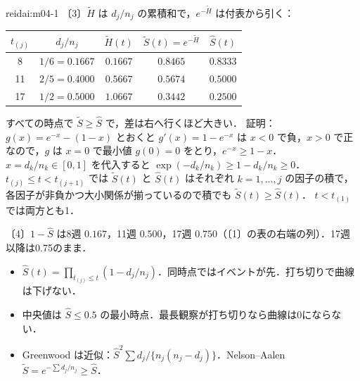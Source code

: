 \begin{kaitou}{reidai:m04-1}
〔3〕$\tilde H$ は $d_j/n_j$ の累積和で，$e^{-\tilde H}$ は付表から引く：
\begin{center}\small
\begin{tabular}{@{}ccccc@{}}
\toprule
$t_{(j)}$ & $d_j/n_j$ & $\tilde H(t)$ & $\tilde S(t)=e^{-\tilde H}$ & $\hat S(t)$\\
\midrule
8 & $1/6=0.1667$ & $0.1667$ & $0.8465$ & $0.8333$\\
11 & $2/5=0.4000$ & $0.5667$ & $0.5674$ & $0.5000$\\
17 & $1/2=0.5000$ & $1.0667$ & $0.3442$ & $0.2500$\\
\bottomrule
\end{tabular}
\end{center}
すべての時点で $\tilde S\ge\hat S$ で，差は右へ行くほど大きい．
証明：$g(x)=e^{-x}-(1-x)$ とおくと $g'(x)=1-e^{-x}$ は $x<0$ で負，$x>0$ で正なので，$g$ は $x=0$ で最小値 $g(0)=0$ をとり，$e^{-x}\ge1-x$．
$x=d_k/n_k\in[0,1]$ を代入すると $\exp(-d_k/n_k)\ge1-d_k/n_k\ge0$．
$t_{(j)}\le t<t_{(j+1)}$ では $\tilde S(t)$ と $\hat S(t)$ はそれぞれ $k=1,\dots,j$ の因子の積で，各因子が非負かつ大小関係が揃っているので積でも $\tilde S(t)\ge\hat S(t)$．
$t<t_{(1)}$ では両方とも1．

〔4〕$1-\hat S$ は8週 $0.167$，11週 $0.500$，17週 $0.750$（〔1〕の表の右端の列）．17週以降は0.75のまま．
\end{kaitou}

\begin{summarybox}
\begin{itemize}
\item $\hat S(t)=\prod_{t_{(j)}\le t}(1-d_j/n_j)$．同時点ではイベントが先．打ち切りで曲線は下げない．
\item 中央値は $\hat S\le0.5$ の最小時点．最長観察が打ち切りなら曲線は0にならない．
\item Greenwood は近似：$\hat S^2\sum d_j/\{n_j(n_j-d_j)\}$．Nelson--Aalen $\tilde S=e^{-\sum d_j/n_j}\ge\hat S$．
\end{itemize}
\end{summarybox}
